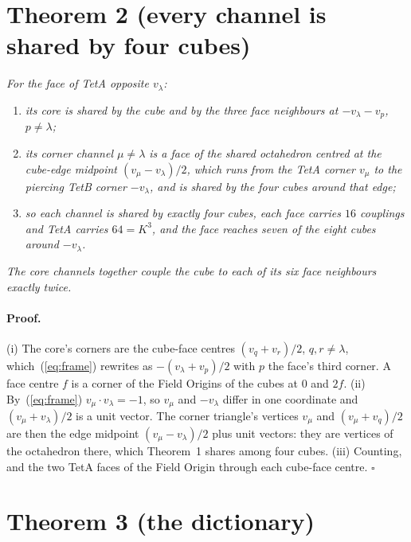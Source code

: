 \documentclass[twocolumn]{iopjournal}
\begin{document}

\section*{Theorem 2 (every channel is shared by four cubes)}

\emph{For the face of TetA opposite $v_\lambda$:}
\begin{enumerate}
\item[(i)] \emph{its core is shared by the cube and by the three face
  neighbours at $-v_\lambda - v_p$, $p \neq \lambda$;}
\item[(ii)] \emph{its corner channel $\mu \neq \lambda$ is a face of
  the shared octahedron centred at the cube-edge midpoint
  $(v_\mu - v_\lambda)/2$, which runs from the TetA corner $v_\mu$ to
  the piercing TetB corner $-v_\lambda$, and is shared by the four
  cubes around that edge;}
\item[(iii)] \emph{so each channel is shared by exactly four cubes,
  each face carries $16$ couplings and TetA carries $64 = K^3$, and
  the face reaches seven of the eight cubes around $-v_\lambda$.}
\end{enumerate}
\emph{The core channels together couple the cube to each of its six
face neighbours exactly twice.}

\paragraph{Proof.} (i) The core's corners are the cube-face centres
$(v_q + v_r)/2$, $q, r \ne \lambda$, which~(\ref{eq:frame}) rewrites
as $-(v_\lambda + v_p)/2$ with $p$ the face's third corner. A face
centre $f$ is a corner of the Field Origins of the cubes at $0$ and
$2f$. (ii) By~(\ref{eq:frame}) $v_\mu \cdot v_\lambda = -1$, so
$v_\mu$ and $-v_\lambda$ differ in one coordinate and
$(v_\mu + v_\lambda)/2$ is a unit vector. The corner triangle's
vertices $v_\mu$ and $(v_\mu + v_q)/2$ are then the edge midpoint
$(v_\mu - v_\lambda)/2$ plus unit vectors: they are vertices of the
octahedron there, which Theorem~1 shares among four cubes. (iii)
Counting, and the two TetA faces of the Field Origin through each
cube-face centre. \hfill $\square$


\section*{Theorem 3 (the dictionary)}
\end{document}

